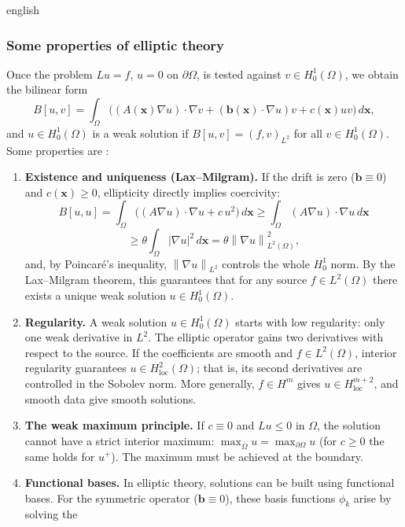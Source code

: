 \documentclass[12pt,letterpaper,twoside]{book}
\newcommand{\norm}[1]{\left\lVert #1 \right\rVert}
\newcommand{\abs}[1]{\left\lvert #1 \right\rvert}
\begin{document}
\begin{hyphenrules}{english}
\subsubsection{Some properties of elliptic theory}
Once the problem $Lu=f$, $u=0$ on $\partial\Omega$, is tested against $v\in H^1_0(\Omega)$, we obtain
the bilinear form
\begin{equation}
  B[u,v]=\int_\Omega\Big((A(\mathbf{x})\nabla u)\cdot\nabla v+(\mathbf{b}(\mathbf{x})\cdot\nabla u)v+c(\mathbf{x})uv\Big)\,d\mathbf{x},
  \label{eq:elliptic-bilinear}
\end{equation}
and $u\in H^1_0(\Omega)$ is a weak solution if $B[u,v]=(f,v)_{L^2}$ for all $v\in H^1_0(\Omega)$. Some
properties are \cite{evans2010}:
\begin{enumerate}
  \item \textbf{Existence and uniqueness (Lax--Milgram).} If the drift is zero ($\mathbf{b}\equiv0$) and
    $c(\mathbf{x})\ge0$, ellipticity directly implies coercivity:
    \[
      B[u,u]=\int_\Omega\big((A\nabla u)\cdot\nabla u+c\,u^2\big)\,d\mathbf{x}
      \ge\int_\Omega(A\nabla u)\cdot\nabla u\,d\mathbf{x}
    \]
    \[
      \ge\theta\int_\Omega\abs{\nabla u}^2\,d\mathbf{x}=\theta\norm{\nabla u}_{L^2(\Omega)}^2,
    \]
    and, by Poincaré's inequality, $\norm{\nabla u}_{L^2}$ controls the whole $H^1_0$ norm. By the
    Lax--Milgram theorem, this guarantees that for any source $f\in L^2(\Omega)$ there exists a unique
    weak solution $u\in H^1_0(\Omega)$.
  \item \textbf{Regularity.} A weak solution $u\in H^1_0(\Omega)$ starts with low regularity: only one
    weak derivative in $L^2$. The elliptic operator gains two derivatives with respect to the source. If
    the coefficients are smooth and $f\in L^2(\Omega)$, interior regularity guarantees
    $u\in H^2_{\mathrm{loc}}(\Omega)$; that is, its second derivatives are controlled in the Sobolev norm.
    More generally, $f\in H^m$ gives $u\in H^{m+2}_{\mathrm{loc}}$, and smooth data give smooth solutions.
  \item \textbf{The weak maximum principle.} If $c\equiv0$ and $Lu\le0$ in $\Omega$, the solution
    cannot have a strict interior maximum: $\max_{\bar\Omega}u=\max_{\partial\Omega}u$ (for $c\ge0$ the
    same holds for $u^+$). The maximum must be achieved at the boundary.
  \item \textbf{Functional bases.} In elliptic theory, solutions can be built using functional bases.
    For the symmetric operator ($\mathbf{b}\equiv0$), these basis functions $\phi_k$ arise by solving the

\end{enumerate}
\end{hyphenrules}
\end{document}
